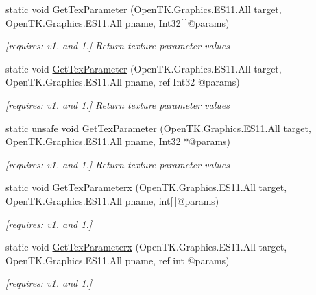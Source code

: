 \begin{DoxyCompactItemize}
static void \hyperlink{class_open_t_k_1_1_graphics_1_1_e_s11_1_1_g_l_ad638c639245c85d0fda04d1284bfd77e}{Get\-Tex\-Parameter} (Open\-T\-K.\-Graphics.\-E\-S11.\-All target, Open\-T\-K.\-Graphics.\-E\-S11.\-All pname, Int32\mbox{[}$\,$\mbox{]}@params)
\begin{DoxyCompactList}\small\item\em \mbox{[}requires\-: v1. and 1.\mbox{]} Return texture parameter values \end{DoxyCompactList}\item 
static void \hyperlink{class_open_t_k_1_1_graphics_1_1_e_s11_1_1_g_l_af0d6c3f90bf2382f5deeac62ae2a2d04}{Get\-Tex\-Parameter} (Open\-T\-K.\-Graphics.\-E\-S11.\-All target, Open\-T\-K.\-Graphics.\-E\-S11.\-All pname, ref Int32 @params)
\begin{DoxyCompactList}\small\item\em \mbox{[}requires\-: v1. and 1.\mbox{]} Return texture parameter values \end{DoxyCompactList}\item 
static unsafe void \hyperlink{class_open_t_k_1_1_graphics_1_1_e_s11_1_1_g_l_a9e98d3db917e108d3f3b355ed2a03042}{Get\-Tex\-Parameter} (Open\-T\-K.\-Graphics.\-E\-S11.\-All target, Open\-T\-K.\-Graphics.\-E\-S11.\-All pname, Int32 $\ast$@params)
\begin{DoxyCompactList}\small\item\em \mbox{[}requires\-: v1. and 1.\mbox{]} Return texture parameter values \end{DoxyCompactList}\item 
static void \hyperlink{class_open_t_k_1_1_graphics_1_1_e_s11_1_1_g_l_a8615d7d7a34b41e2ed83c5bc13d1bb83}{Get\-Tex\-Parameterx} (Open\-T\-K.\-Graphics.\-E\-S11.\-All target, Open\-T\-K.\-Graphics.\-E\-S11.\-All pname, int\mbox{[}$\,$\mbox{]}@params)
\begin{DoxyCompactList}\small\item\em \mbox{[}requires\-: v1. and 1.\mbox{]}\end{DoxyCompactList}\item 
static void \hyperlink{class_open_t_k_1_1_graphics_1_1_e_s11_1_1_g_l_a1a895100a50494d19176439e704c48f6}{Get\-Tex\-Parameterx} (Open\-T\-K.\-Graphics.\-E\-S11.\-All target, Open\-T\-K.\-Graphics.\-E\-S11.\-All pname, ref int @params)
\begin{DoxyCompactList}\small\item\em \mbox{[}requires\-: v1. and 1.\mbox{]}\end{DoxyCompactList}\item 

\end{DoxyCompactItemize}
